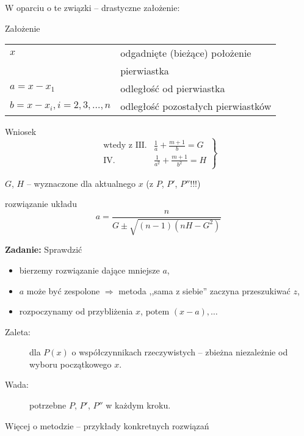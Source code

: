 \begin{frame}
  W oparciu o te związki -- drastyczne założenie:
  \begin{block}{Założenie}
    \begin{tabular}{ll}
      $x$ & odgadnięte (bieżące) położenie \\
      & pierwiastka \\
      $a = x - x_1$ & odległość od pierwiastka \\
      $b = x - x_i, i = 2,3, \dots , n$ & odległość pozostałych pierwiastków
    \end{tabular}
  \end{block}

  \begin{block}{Wniosek}
    $$ \left. \begin{array}{rl}
      \text{wtedy z III.} & \frac{1}{a} + \frac{m+1}{b} = G \\ %
      \text{IV.} & \frac{1}{a^2} + \frac{m+1}{b^2} = H
    \end{array} \right\} $$
  \end{block}

$G$, $H$ -- wyznaczone dla aktualnego $x$ (z $P$, $P'$, $P''$!!!)
\end{frame}

\begin{frame}
  \begin{block}{rozwiązanie układu}
    $$a = \frac{n}{G \pm \sqrt{(n-1)(nH-G^2)}}$$
  \end{block}

  \textbf{Zadanie:} Sprawdzić

  \begin{itemize}
    \item bierzemy rozwiązanie dające mniejsze $a$,
    \item $a$ może być zespolone $\Rightarrow$ metoda ,,sama z siebie'' zaczyna przeszukiwać $z$, %
    \item rozpoczynamy od przybliżenia $x$, potem $(x-a),\dots $
  \end{itemize}
\end{frame}

\begin{frame}
  \begin{block}{}
    \begin{description}
      \item[Zaleta:] dla $P(x)$ o współczynnikach rzeczywistych -- zbieżna niezależnie od wyboru początkowego $x$.
      \item[Wada:] potrzebne $P$, $P'$, $P''$ w każdym kroku.
    \end{description}
  \end{block}

  Więcej o metodzie -- przykłady konkretnych rozwiązań \cite{Adams}
\end{frame}
